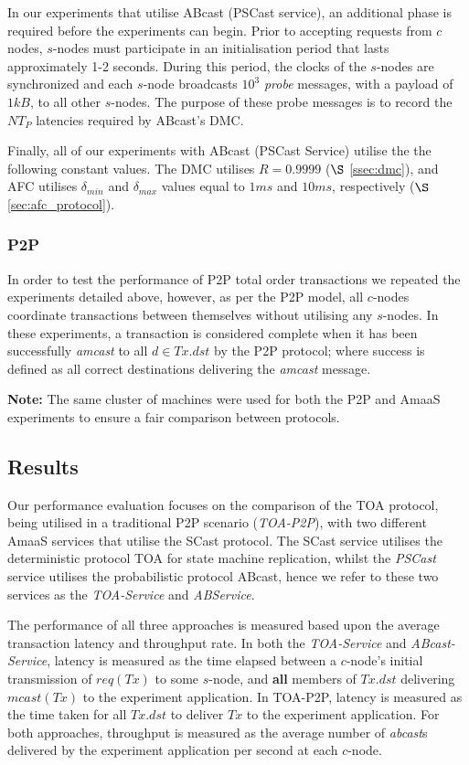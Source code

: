     In our experiments that utilise \textsf{ABcast} (\textsf{PSCast} service), an additional phase is required before the experiments can begin.  Prior to accepting requests from $c$ nodes, $s$-nodes must participate in an initialisation period that lasts approximately 1-2 seconds.  During this period, the clocks of the $s$-nodes are synchronized and each $s$-node broadcasts $10^3$ \emph{probe} messages, with a payload of $1kB$, to all other $s$-nodes.  The purpose of these probe messages is to record the $NT_P$ latencies required by \textsf{ABcast}'s DMC.  
    
    Finally, all of our experiments with \textsf{ABcast} (\textsf{PSCast} Service) utilise the the following constant values.  The DMC utilises $R=0.9999$ ($\S$ \ref{ssec:dmc}), and AFC utilises $\delta_{min}$ and $\delta_{max}$ values equal to $1ms$ and $10ms$, respectively ($\S$ \ref{sec:afc_protocol}).  
	
	\subsubsection*{P2P}
	In order to test the performance of P2P total order transactions we repeated the experiments detailed above, however, as per the P2P model, all $c$-nodes coordinate transactions between themselves without utilising any $s$-nodes.  In these experiments, a transaction is considered complete when it has been successfully \emph{amcast} to all $d \in Tx.dst$ by the P2P protocol; where success is defined as all correct destinations delivering the \emph{amcast} message. 
	
	\textbf{Note:} The same cluster of machines were used for both the P2P and \textsf{AmaaS} experiments to ensure a fair comparison between protocols.   
	
	\subsection{Results}\label{sec:AmaaS_results}
	Our performance evaluation focuses on the comparison of the TOA protocol, being utilised in a traditional P2P scenario (\emph{TOA-P2P}), with two different \textsf{AmaaS} services that utilise the \textsf{SCast} protocol.  The \textsf{SCast} service utilises the deterministic protocol TOA for state machine replication, whilst the \emph{PSCast} service utilises the probabilistic protocol \textsf{ABcast}, hence we refer to these two services as the \emph{TOA-Service} and \emph{ABService}.  
    
    The performance of all three approaches is measured based upon the average transaction latency and throughput rate. In both the \emph{TOA-Service} and \emph{ABcast-Service}, latency is measured as the time elapsed between a $c$-node's initial transmission of $req(Tx)$ to some $s$-node, and \textbf{all} members of $Tx.dst$ delivering $mcast(Tx)$ to the experiment application. In TOA-P2P, latency is measured as the time taken for all $Tx.dst$ to deliver $Tx$ to the experiment application. For both approaches, throughput is measured as the average number of \emph{abcast}s delivered by the experiment application per second at each $c$-node.
	
